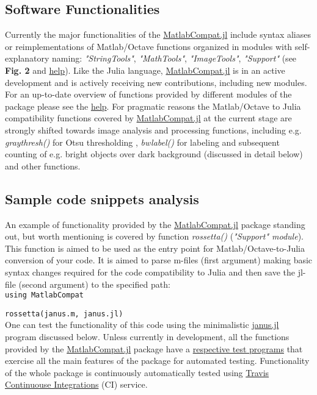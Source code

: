 \subsection{Software Functionalities}

Currently the major functionalities of the \href{https://github.com/MatlabCompat/MatlabCompat.jl}{MatlabCompat.jl} include syntax aliases or reimplementations of Matlab/Octave functions organized in modules with self-explanatory naming: \textit{"StringTools"}, \textit{"MathTools"}, \textit{"ImageTools"}, \textit{"Support"} (see \textbf{Fig. 2} and \href{http://matlabcompat.github.io/help.html}{help}). Like the Julia language, \href{https://github.com/MatlabCompat/MatlabCompat.jl}{MatlabCompat.jl} is in an active development and is actively receiving new contributions, including new modules. For an up-to-date overview of functions provided by different modules of the package please see the \href{http://matlabcompat.github.io/help.html}{help}. For pragmatic reasons the Matlab/Octave to Julia compatibility functions covered by \href{https://github.com/MatlabCompat/MatlabCompat.jl}{MatlabCompat.jl} at the current stage are strongly shifted towards image analysis and processing functions, including e.g. \textit{graythresh()} for Otsu thresholding \cite{otsu1975threshold}, \textit{bwlabel()} for labeling and subsequent counting of e.g. bright objects over dark background (discussed in detail below) and other functions.

\subsection{Sample code snippets analysis}

An example of functionality provided by the \href{https://github.com/MatlabCompat/MatlabCompat.jl}{MatlabCompat.jl} package standing out, but worth mentioning is covered by function \textit{rossetta()} (\textit{"Support" module}). This function is aimed to be used as the entry point for Matlab/Octave-to-Julia conversion of your code. It is aimed to parse m-files (first argument) making basic syntax changes required for the code compatibility to Julia and then save the jl-file (second argument) to the specified path:\\

\verb|using MatlabCompat|

\verb|rossetta(janus.m, janus.jl)|\\

One can test the functionality of this code using the minimalistic \href{https://github.com/MatlabCompat/MatlabCompat.jl/blob/master/test/janus.jl}{janus.jl} program discussed below. Unless currently in development, all the functions provided by the \href{https://github.com/MatlabCompat/MatlabCompat.jl}{MatlabCompat.jl} package have a \href{https://github.com/MatlabCompat/MatlabCompat.jl/tree/master/test}{respective test programs} that exercise all the main features of the package for automated testing. Functionality of the whole package is continuously automatically tested using \href{https://travis-ci.org/MatlabCompat/MatlabCompat.jl}{Travis Continuouse Integrations} (CI) service.
  